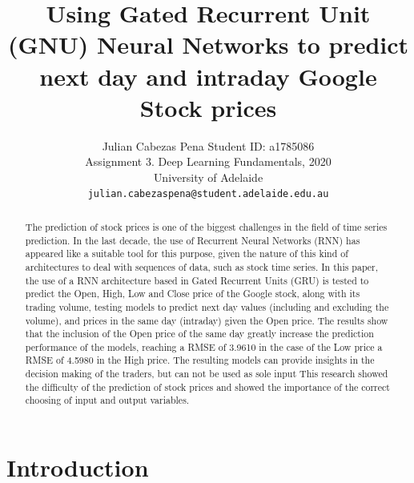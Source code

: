 \documentclass[10pt,twocolumn,letterpaper]{article}
\begin{document}
\title{Using Gated Recurrent Unit (GNU) Neural Networks to predict next day and intraday Google Stock prices}

\author{Julian Cabezas Pena Student ID: a1785086\\
Assignment 3. Deep Learning Fundamentals, 2020 \\
University of Adelaide\\
{\tt\small julian.cabezaspena@student.adelaide.edu.au}
}

\maketitle

\begin{abstract}
	
The prediction of stock prices is one of the biggest challenges in the field of time series prediction. In the last decade, the use of Recurrent Neural Networks (RNN) has appeared like a suitable tool for this purpose, given the nature of this kind of architectures to deal with sequences of data, such as stock time series. In this paper, the use of a RNN architecture based in Gated Recurrent Units (GRU) is tested to predict the Open, High, Low and Close price of the Google stock, along with its trading volume, testing models to predict next day values (including and excluding the volume), and prices in the same day (intraday) given the Open price. The results show that the inclusion of the Open price of the same day greatly increase the prediction performance of the models, reaching a RMSE of 3.9610 in the case of the Low price a RMSE of 4.5980 in the High price. The resulting models can provide insights in the decision making of the traders, but can not be used as sole input This research showed the difficulty of the prediction of stock prices and showed the importance of the correct choosing of input and output variables.

\end{abstract}

\section{Introduction}
\end{document}
